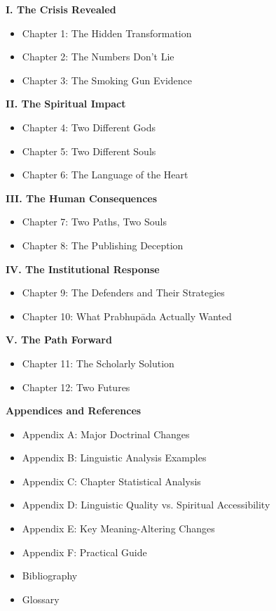 \documentclass[11pt,twoside]{book}
\begin{document}
\noindent
\textbf{I.  The Crisis Revealed}
\vspace{0.2cm}
\begin{itemize}
\item Chapter 1: The Hidden Transformation
\item Chapter 2: The Numbers Don't Lie
\item Chapter 3: The Smoking Gun Evidence
\end{itemize}

\vspace{0.7cm}
\noindent
\textbf{II.  The Spiritual Impact}
\vspace{0.2cm}
\begin{itemize}
\item Chapter 4: Two Different Gods
\item Chapter 5: Two Different Souls
\item Chapter 6: The Language of the Heart
\end{itemize}

\vspace{0.7cm}
\noindent
\textbf{III.  The Human Consequences}
\vspace{0.2cm}
\begin{itemize}
\item Chapter 7: Two Paths, Two Souls
\item Chapter 8: The Publishing Deception
\end{itemize}

\vspace{0.7cm}
\noindent
\textbf{IV.  The Institutional Response}
\vspace{0.2cm}
\begin{itemize}
\item Chapter 9: The Defenders and Their Strategies
\item Chapter 10: What Prabhupāda Actually Wanted
\end{itemize}

\vspace{0.7cm}
\noindent
\textbf{V.  The Path Forward}
\vspace{0.2cm}
\begin{itemize}
\item Chapter 11: The Scholarly Solution
\item Chapter 12: Two Futures
\end{itemize}

\newpage
\thispagestyle{empty}

\textbf{Appendices and References}
\begin{itemize}
\item Appendix A: Major Doctrinal Changes
\item Appendix B: Linguistic Analysis Examples
\item Appendix C: Chapter Statistical Analysis
\item Appendix D: Linguistic Quality vs. Spiritual Accessibility
\item Appendix E: Key Meaning-Altering Changes
\item Appendix F: Practical Guide
\item Bibliography
\item Glossary
\end{itemize}
\end{document}
